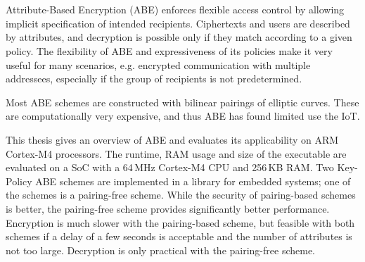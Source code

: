 \chapter{\abstractname}

Attribute-Based Encryption (ABE) enforces flexible access control by allowing implicit specification of intended recipients.
Ciphertexts and users are described by attributes, and decryption is possible only if they match according to a given policy.
The flexibility of ABE and expressiveness of its policies make it very useful for many scenarios, e.g. encrypted communication with multiple addressees, especially if the group of recipients is not predetermined.

Most ABE schemes are constructed with bilinear pairings of elliptic curves.
These are computationally very expensive, and thus ABE has found limited use the IoT.

This thesis gives an overview of ABE and evaluates its applicability on ARM Cortex-M4 processors.
The runtime, RAM usage and size of the executable are evaluated on a SoC with a 64\,MHz Cortex-M4 CPU and 256\,KB RAM.
Two Key-Policy ABE schemes are implemented in a library for embedded systems; one of the schemes is a pairing-free scheme.
While the security of pairing-based schemes is better, the pairing-free scheme provides significantly better performance.
Encryption is much slower with the pairing-based scheme, but feasible with both schemes if a delay of a few seconds is acceptable and the number of attributes is not too large.
Decryption is only practical with the pairing-free scheme.